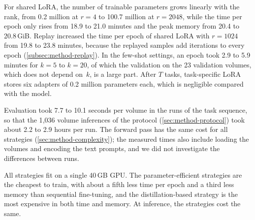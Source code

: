 For shared LoRA, the number of trainable parameters grows linearly with the rank, from 0.2 million at $r = 4$ to 100.7 million at $r = 2048$, while the time per epoch only rises from 18.9 to 21.0 minutes and the peak memory from 20.4 to 20.8\,GiB.
Replay increased the time per epoch of shared LoRA with $r = 1024$ from 19.8 to 23.8 minutes, because the replayed samples add iterations to every epoch (\cref{subsec:method-replay}).
In the few-shot settings, an epoch took 2.9 to 5.9 minutes for $k = 5$ to $k = 20$, of which the validation on the 23 validation volumes, which does not depend on~$k$, is a large part.
After $T$ tasks, task-specific LoRA stores six adapters of 0.2 million parameters each, which is negligible compared with the model.

Evaluation took 7.7 to 10.1 seconds per volume in the runs of the task sequence, so that the 1{,}036 volume inferences of the protocol (\cref{sec:method-protocol}) took about 2.2 to 2.9 hours per run.
The forward pass has the same cost for all strategies (\cref{sec:method-complexity}); the measured times also include loading the volumes and encoding the text prompts, and we did not investigate the differences between runs.

All strategies fit on a single 40\,GB GPU.
The parameter-efficient strategies are the cheapest to train, with about a fifth less time per epoch and a third less memory than sequential fine-tuning, and the distillation-based strategy is the most expensive in both time and memory.
At inference, the strategies cost the same.
